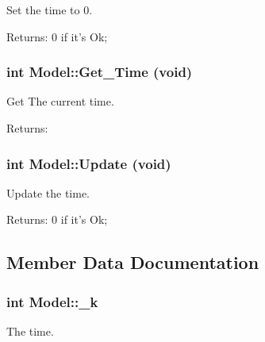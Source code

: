 Set the time to 0. 

\begin{Desc}
\item[Returns:]0 if it's Ok; \end{Desc}
\hypertarget{class_model_efbca8bb1098349a9c4c3ccfbba02aa2}{
\subsubsection[{Get\_\-Time}]{\setlength{\rightskip}{0pt plus 5cm}int Model::Get\_\-Time (void)}}
\label{class_model_efbca8bb1098349a9c4c3ccfbba02aa2}


Get The current time. 

\begin{Desc}
\item[Returns:]\end{Desc}
\hypertarget{class_model_e51159f212efa0af4b7c95a3d81e65db}{
\subsubsection[{Update}]{\setlength{\rightskip}{0pt plus 5cm}int Model::Update (void)}}
\label{class_model_e51159f212efa0af4b7c95a3d81e65db}


Update the time. 

\begin{Desc}
\item[Returns:]0 if it's Ok; \end{Desc}


\subsection{Member Data Documentation}
\hypertarget{class_model_7bacdb5f50e67614833eacb6df7d68e9}{
\subsubsection[{\_\-k}]{\setlength{\rightskip}{0pt plus 5cm}int {\bf Model::\_\-k}}}
\label{class_model_7bacdb5f50e67614833eacb6df7d68e9}


The time. 

